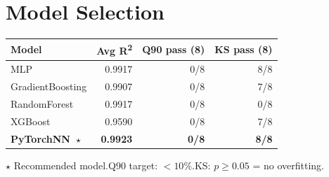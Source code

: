 \documentclass[9pt,a4paper]{article}
\begin{document}
\section{Model Selection}
\begin{minipage}{\linewidth}
\renewcommand{\arraystretch}{1.2}
\begin{tabular}{|l|r|r|r|}
  \hline
  \textbf{Model} & \textbf{Avg R\textsuperscript{2}} & \textbf{Q90 pass (8)} & \textbf{KS pass (8)} \\ \hline
  { MLP} & { 0.9917} & { 0/8} & { 8/8} \\ \hline
  { GradientBoosting} & { 0.9907} & { 0/8} & { 7/8} \\ \hline
  { RandomForest} & { 0.9917} & { 0/8} & { 0/8} \\ \hline
  { XGBoost} & { 0.9590} & { 0/8} & { 7/8} \\ \hline
  {\bfseries PyTorchNN\ $\star$} & {\bfseries 0.9923} & {\bfseries 0/8} & {\bfseries 8/8} \\ \hline
\end{tabular}
\par\vspace{4pt}
{\footnotesize $\star$ Recommended model.\enspace Q90 target: $<10\%$.\enspace KS: $p\geq 0.05$ = no overfitting.}
\end{minipage}
\end{document}
